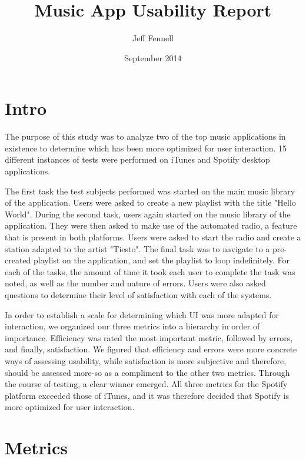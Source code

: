 \documentclass[12pt]{report}
\begin{document}
\title{Music App Usability Report}
\author{Jeff Fennell}
\date{September 2014}
\maketitle

\tableofcontents

\section{Intro}

The purpose of this study was to analyze two of the top music 
applications in existence to determine which has been more 
optimized for user interaction. 15 different instances of tests 
were performed on iTunes and Spotify desktop applications.

The first task the test subjects performed was started on the main 
music library of the application. Users were asked to create a new 
playlist with the title "Hello World".  During the second task, 
users again started on the music library of the application. They 
were then asked to make use of the automated radio, a feature that 
is present in both platforms. Users were asked to start the radio 
and create a station adapted to the artist "Tiesto". The final 
task was to navigate to a pre-created playlist on the application, 
and set the playlist to loop indefinitely. For each of the tasks, 
the amount of time it took each user to complete the task was 
noted, as well as the number and nature of errors. Users were also 
asked questions to determine their level of satisfaction with each 
of the systems.

In order to establish a scale for determining which UI was more 
adapted for interaction, we organized our three metrics into a 
hierarchy in order of importance. Efficiency was rated the most 
important metric, followed by errors, and finally, satisfaction. 
We figured that efficiency and errors were more concrete ways of 
assessing usability, while satisfaction is more subjective and 
therefore, should be assessed more-so as a compliment to the other 
two metrics. Through the course of testing, a clear winner 
emerged. All three metrics for the Spotify platform exceeded those 
of iTunes, and it was therefore decided that Spotify is more 
optimized for user interaction.

\section{Metrics}
\end{document}
